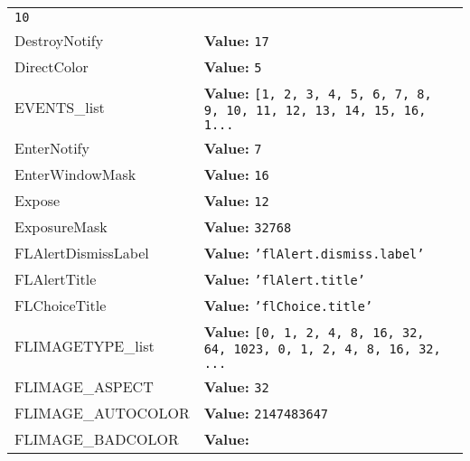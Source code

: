 \begin{longtable}{|p{\varnamewidth}|p{\vardescrwidth}|l}
{\tt 10}&\\
\cline{1-2}
\raggedright D\-e\-s\-t\-r\-o\-y\-N\-o\-t\-i\-f\-y\- & \raggedright \textbf{Value:} 
{\tt 17}&\\
\cline{1-2}
\raggedright D\-i\-r\-e\-c\-t\-C\-o\-l\-o\-r\- & \raggedright \textbf{Value:} 
{\tt 5}&\\
\cline{1-2}
\raggedright E\-V\-E\-N\-T\-S\-\_\-l\-i\-s\-t\- & \raggedright \textbf{Value:} 
{\tt \texttt{[}1\texttt{, }2\texttt{, }3\texttt{, }4\texttt{, }5\texttt{, }6\texttt{, }7\texttt{, }8\texttt{, }9\texttt{, }10\texttt{, }11\texttt{, }12\texttt{, }13\texttt{, }14\texttt{, }15\texttt{, }16\texttt{, }1\texttt{...}}&\\
\cline{1-2}
\raggedright E\-n\-t\-e\-r\-N\-o\-t\-i\-f\-y\- & \raggedright \textbf{Value:} 
{\tt 7}&\\
\cline{1-2}
\raggedright E\-n\-t\-e\-r\-W\-i\-n\-d\-o\-w\-M\-a\-s\-k\- & \raggedright \textbf{Value:} 
{\tt 16}&\\
\cline{1-2}
\raggedright E\-x\-p\-o\-s\-e\- & \raggedright \textbf{Value:} 
{\tt 12}&\\
\cline{1-2}
\raggedright E\-x\-p\-o\-s\-u\-r\-e\-M\-a\-s\-k\- & \raggedright \textbf{Value:} 
{\tt 32768}&\\
\cline{1-2}
\raggedright F\-L\-A\-l\-e\-r\-t\-D\-i\-s\-m\-i\-s\-s\-L\-a\-b\-e\-l\- & \raggedright \textbf{Value:} 
{\tt \texttt{'}\texttt{flAlert.dismiss.label}\texttt{'}}&\\
\cline{1-2}
\raggedright F\-L\-A\-l\-e\-r\-t\-T\-i\-t\-l\-e\- & \raggedright \textbf{Value:} 
{\tt \texttt{'}\texttt{flAlert.title}\texttt{'}}&\\
\cline{1-2}
\raggedright F\-L\-C\-h\-o\-i\-c\-e\-T\-i\-t\-l\-e\- & \raggedright \textbf{Value:} 
{\tt \texttt{'}\texttt{flChoice.title}\texttt{'}}&\\
\cline{1-2}
\raggedright F\-L\-I\-M\-A\-G\-E\-T\-Y\-P\-E\-\_\-l\-i\-s\-t\- & \raggedright \textbf{Value:} 
{\tt \texttt{[}0\texttt{, }1\texttt{, }2\texttt{, }4\texttt{, }8\texttt{, }16\texttt{, }32\texttt{, }64\texttt{, }1023\texttt{, }0\texttt{, }1\texttt{, }2\texttt{, }4\texttt{, }8\texttt{, }16\texttt{, }32\texttt{, }\texttt{...}}&\\
\cline{1-2}
\raggedright F\-L\-I\-M\-A\-G\-E\-\_\-A\-S\-P\-E\-C\-T\- & \raggedright \textbf{Value:} 
{\tt 32}&\\
\cline{1-2}
\raggedright F\-L\-I\-M\-A\-G\-E\-\_\-A\-U\-T\-O\-C\-O\-L\-O\-R\- & \raggedright \textbf{Value:} 
{\tt 2147483647}&\\
\cline{1-2}
\raggedright F\-L\-I\-M\-A\-G\-E\-\_\-B\-A\-D\-C\-O\-L\-O\-R\- & \raggedright \textbf{Value:} 

\end{longtable}
